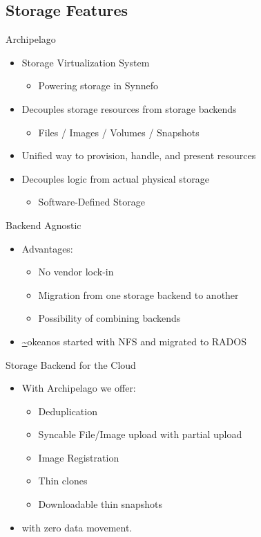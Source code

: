 \documentclass[utf8]{beamer}
\newcommand{\okeanos}{\url{~}okeanos}
\begin{document}
\subsection{Storage Features}

\begin{frame}{Archipelago}
  \begin{itemize}
    \item Storage Virtualization System
      \begin{itemize}
        \item Powering storage in Synnefo
      \end{itemize}
    \item Decouples storage resources from storage backends
      \begin{itemize}
        \item Files / Images / Volumes / Snapshots
      \end{itemize}
    \item Unified way to provision, handle, and present resources
    \item Decouples logic from actual physical storage
      \begin{itemize}
        \item Software-Defined Storage
      \end{itemize}
  \end{itemize}
\end{frame}

\begin{frame}{Backend Agnostic}
  \begin{itemize}
    \item Advantages:
      \begin{itemize}
      \item No vendor lock-in
      \item Migration from one storage backend to another
      \item Possibility of combining backends
    \end{itemize}
    \item \okeanos{} started with NFS and migrated to RADOS
  \end{itemize}
\end{frame}

\begin{frame}{Storage Backend for the Cloud}
  \begin{itemize}
  \item With Archipelago we offer:
    \begin{itemize}
      \item Deduplication
      \item Syncable File/Image upload with partial upload
      \item Image Registration
      \item Thin clones
      \item Downloadable thin snapshots
    \end{itemize}
  \item with zero data movement.
  \end{itemize}
\end{frame}
\end{document}
